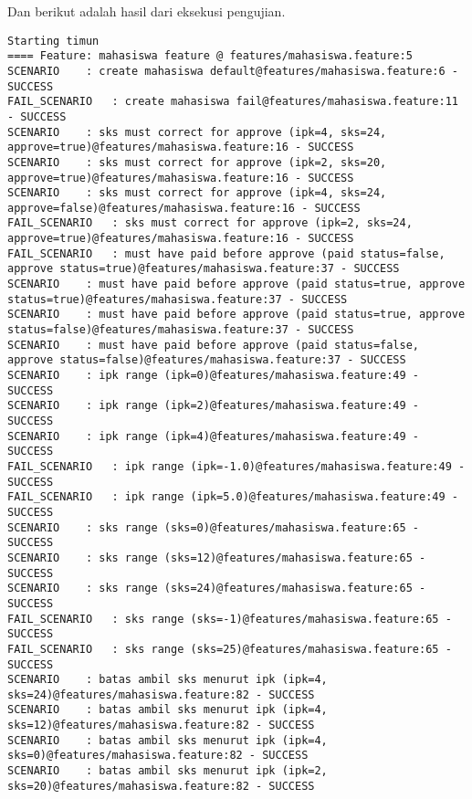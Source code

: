 Dan berikut adalah hasil dari eksekusi pengujian.

\begin{lstlisting}[language=testresult]
Starting timun
==== Feature: mahasiswa feature @ features/mahasiswa.feature:5
SCENARIO	: create mahasiswa default@features/mahasiswa.feature:6 - SUCCESS
FAIL_SCENARIO	: create mahasiswa fail@features/mahasiswa.feature:11 - SUCCESS
SCENARIO	: sks must correct for approve (ipk=4, sks=24, approve=true)@features/mahasiswa.feature:16 - SUCCESS
SCENARIO	: sks must correct for approve (ipk=2, sks=20, approve=true)@features/mahasiswa.feature:16 - SUCCESS
SCENARIO	: sks must correct for approve (ipk=4, sks=24, approve=false)@features/mahasiswa.feature:16 - SUCCESS
FAIL_SCENARIO	: sks must correct for approve (ipk=2, sks=24, approve=true)@features/mahasiswa.feature:16 - SUCCESS
FAIL_SCENARIO	: must have paid before approve (paid status=false, approve status=true)@features/mahasiswa.feature:37 - SUCCESS
SCENARIO	: must have paid before approve (paid status=true, approve status=true)@features/mahasiswa.feature:37 - SUCCESS
SCENARIO	: must have paid before approve (paid status=true, approve status=false)@features/mahasiswa.feature:37 - SUCCESS
SCENARIO	: must have paid before approve (paid status=false, approve status=false)@features/mahasiswa.feature:37 - SUCCESS
SCENARIO	: ipk range (ipk=0)@features/mahasiswa.feature:49 - SUCCESS
SCENARIO	: ipk range (ipk=2)@features/mahasiswa.feature:49 - SUCCESS
SCENARIO	: ipk range (ipk=4)@features/mahasiswa.feature:49 - SUCCESS
FAIL_SCENARIO	: ipk range (ipk=-1.0)@features/mahasiswa.feature:49 - SUCCESS
FAIL_SCENARIO	: ipk range (ipk=5.0)@features/mahasiswa.feature:49 - SUCCESS
SCENARIO	: sks range (sks=0)@features/mahasiswa.feature:65 - SUCCESS
SCENARIO	: sks range (sks=12)@features/mahasiswa.feature:65 - SUCCESS
SCENARIO	: sks range (sks=24)@features/mahasiswa.feature:65 - SUCCESS
FAIL_SCENARIO	: sks range (sks=-1)@features/mahasiswa.feature:65 - SUCCESS
FAIL_SCENARIO	: sks range (sks=25)@features/mahasiswa.feature:65 - SUCCESS
SCENARIO	: batas ambil sks menurut ipk (ipk=4, sks=24)@features/mahasiswa.feature:82 - SUCCESS
SCENARIO	: batas ambil sks menurut ipk (ipk=4, sks=12)@features/mahasiswa.feature:82 - SUCCESS
SCENARIO	: batas ambil sks menurut ipk (ipk=4, sks=0)@features/mahasiswa.feature:82 - SUCCESS
SCENARIO	: batas ambil sks menurut ipk (ipk=2, sks=20)@features/mahasiswa.feature:82 - SUCCESS

\end{lstlisting}
